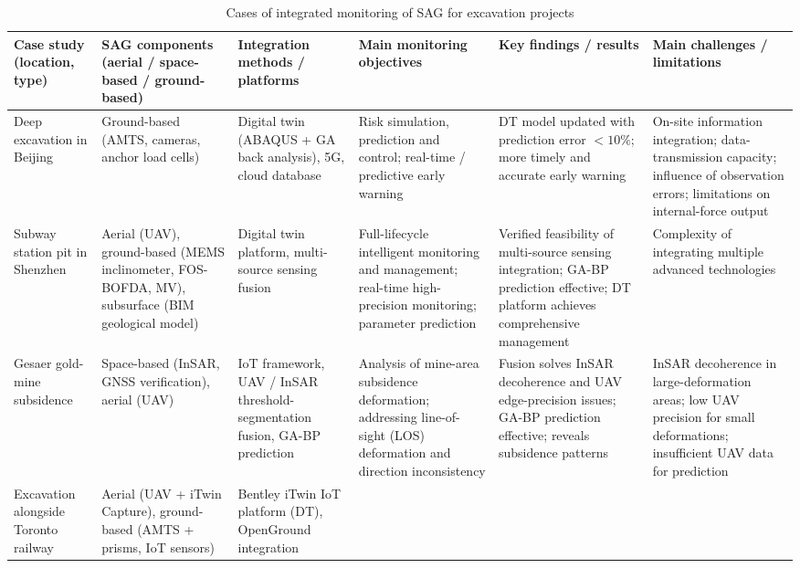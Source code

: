 \documentclass[preprint,11pt,authoryear,3p]{elsarticle}
\begin{document}
\begin{landscape}
\begin{table}[htbp]
  \centering
  \caption{Cases of integrated monitoring of SAG for excavation projects}
  \label{tab:excavation_monitoring}
  \begin{tabular}{p{4cm}p{5cm}p{5.5cm}p{5cm}p{5cm}p{5cm}}
    \toprule
    Case study (location, type) &
    SAG components (aerial / space-based / ground-based) &
    Integration methods / platforms &
    Main monitoring objectives &
    Key findings / results &
    Main challenges / limitations \\
    \midrule
    Deep excavation in Beijing \citep{buildings15030366} &
    Ground-based (AMTS, cameras, anchor load cells) &
    Digital twin (ABAQUS + GA back analysis), 5G, cloud database &
    Risk simulation, prediction and control; real-time / predictive early warning &
    DT model updated with prediction error $<10\%$; more timely and accurate early warning &
    On-site information integration; data-transmission capacity; influence of observation errors; limitations on internal-force output \\
    \midrule
    Subway station pit in Shenzhen \citep{AnIntegratedIntelligent} &
    Aerial (UAV), ground-based (MEMS inclinometer, FOS-BOFDA, MV), subsurface (BIM geological model) &
    Digital twin platform, multi-source sensing fusion &
    Full-lifecycle intelligent monitoring and management; real-time high-precision monitoring; parameter prediction &
    Verified feasibility of multi-source sensing integration; GA-BP prediction effective; DT platform achieves comprehensive management &
    Complexity of integrating multiple advanced technologies \\
    \midrule
    Gesaer gold-mine subsidence \citep{chen_mining_2025} &
    Space-based (InSAR, GNSS verification), aerial (UAV) &
    IoT framework, UAV / InSAR threshold-segmentation fusion, GA-BP prediction &
    Analysis of mine-area subsidence deformation; addressing line-of-sight (LOS) deformation and direction inconsistency &
    Fusion solves InSAR decoherence and UAV edge-precision issues; GA-BP prediction effective; reveals subsidence patterns &
    InSAR decoherence in large-deformation areas; low UAV precision for small deformations; insufficient UAV data for prediction \\
    \midrule
    Excavation alongside Toronto railway \citep{GeoWeekNewsMonirDT} &
    Aerial (UAV + iTwin Capture), ground-based (AMTS + prisms, IoT sensors) &
    Bentley iTwin IoT platform (DT), OpenGround integration &

\end{tabular}
\end{table}
\end{landscape}
\end{document}
